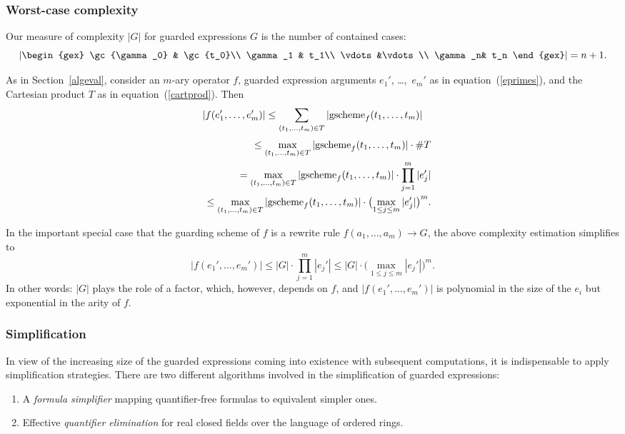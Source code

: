 \subsubsection{Worst-case complexity}
Our measure of complexity $|G|$ for guarded expressions $G$ is the
number of contained cases:
\[
\left|\begin{gex}
\gc{\gamma_0} & \gc{t_0}\\
\gamma_1 & t_1\\
\vdots&\vdots\\
\gamma_n& t_n
\end{gex}\right|=n+1.
\]

As in Section~\ref{algeval}, consider an $m$-ary operator $f$,
guarded expression arguments $e_1'$, \dots,~$e_m'$ as in
equation~(\ref{eprimes}), and the Cartesian product $T$ as in
equation~(\ref{cartprod}). Then
\[
|f(e_1',\ldots,e_m')| \leq  \sum_{(t_1,\dots,t_m)\in
  T}|\textrm{gscheme}_f(t_1,\dots,t_m)|
\]
\begin{eqnarray*}
& &{}\leq  \max_{(t_1,\ldots,t_m)\in
T}|\textrm{gscheme}_f(t_1,\ldots,t_m)|\cdot \#T\\
& & {}=  \max_{(t_1,\ldots,t_m)\in
T}|\textrm{gscheme}_f(t_1,\ldots,t_m)|\cdot \prod_{j=1}^m|e_j'|\\
& & {}\leq  \max_{(t_1,\ldots,t_m)\in
T}|\textrm{gscheme}_f(t_1,\ldots,t_m)|\cdot\bigl(\max_{1\leq j\leq m}|e_j'|\bigr)^m.
\end{eqnarray*}

In the important special case that the guarding scheme of $f$ is a
rewrite rule $f(a_1,\ldots,a_m)\to G$, the above complexity
estimation simplifies to
\[
|f(e_1',\ldots,e_m')| \leq  |G|\cdot \prod_{j=1}^m|e_j'| \leq  |G|\cdot
\bigl(\max_{1\leq j\leq m}|e_j'|\bigr)^m.
\]
In other words: $|G|$ plays the role of a factor, which, however,
depends on $f$, and $|f(e_1',\ldots,e_m')|$ is polynomial in the size
of the $e_i$ but exponential in the arity of $f$.

%
\subsubsection{Simplification}
In view of the increasing size of the guarded expressions coming into
existence with subsequent computations, it is indispensable to apply
simplification strategies. There are two different algorithms involved
in the simplification of guarded expressions:
\begin{enumerate}
\item
A {\em formula simplifier} mapping quantifier-free formulas to
equivalent simpler ones.
\item
Effective {\em quantifier elimination} for real closed fields
over the language of ordered rings.
\end{enumerate}

